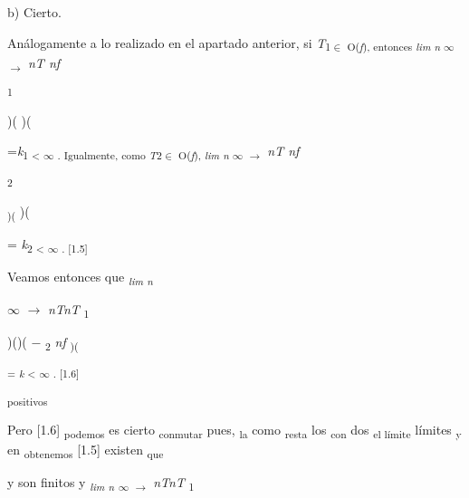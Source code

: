 \documentclass[12pt]{article}
\renewcommand{\_}{\kern-1.5pt\textunderscore\kern-1.5pt}
\begin{document}
{\fontsize{10pt}{12.0pt}\selectfont b) Cierto. \par}\par

{\fontsize{10pt}{12.0pt}\selectfont Análogamente a lo realizado en el apartado anterior, si \textit{T}\textsubscript{1$ \in $ O(\textit{f}), entonces \textit{lim n }$\infty$ $ \rightarrow $  }\textit{nT nf }\par}\par

\textsubscript{1 }\par

)( )({\fontsize{10pt}{12.0pt}\selectfont =\textit{k}\textsubscript{1 < $\infty$ . Igualmente, como \textit{T}2$ \in $ O(\textit{f}), \textit{lim n }$\infty$ $ \rightarrow $  }\textit{nT nf }\par}\par

\textsubscript{2 }\par

\textsubscript{)( })( {\fontsize{10pt}{12.0pt}\selectfont = \textit{k}\textsubscript{2 < $\infty$ . [1.5] }\par}\par

{\fontsize{10pt}{12.0pt}\selectfont Veamos entonces que \textit{\textsubscript{lim n }}\par}\par

{\fontsize{6pt}{7.2pt}\selectfont $\infty$ $ \rightarrow $  \textit{nTnT }\textsubscript{1 }\par}\par

\begin{Center}
)()( $-$  \textsubscript{2 }\textit{nf }\textsubscript{)( }
\end{Center}\par

\textsuperscript{= \textit{k }< $\infty$ . [1.6] }\par

\textsubscript{positivos }{\fontsize{10pt}{12.0pt}\selectfont Pero [1.6] \textsubscript{podemos }es cierto \textsubscript{conmutar }pues, \textsubscript{la }como \textsubscript{resta }los \textsubscript{con }dos \textsubscript{el límite }límites \textsubscript{y }en \textsubscript{obtenemos }[1.5] existen \textsubscript{que }\par}\par

{\fontsize{10pt}{12.0pt}\selectfont y son finitos y \textit{\textsubscript{lim n }}\textsubscript{$\infty$ $ \rightarrow $  }\textit{nTnT }\textsubscript{1 }\par}\par
\end{document}
